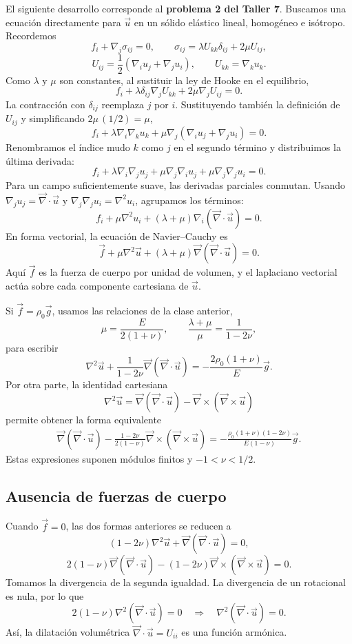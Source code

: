El siguiente desarrollo corresponde al \textbf{problema 2 del Taller 7}. Buscamos una ecuación directamente para $\vec u$ en un sólido elástico lineal, homogéneo e isótropo. Recordemos
\[
f_i+\nabla_j\sigma_{ij}=0,
\qquad
\sigma_{ij}=\lambda U_{kk}\delta_{ij}+2\mu U_{ij},
\]
\[
U_{ij}=\frac{1}{2}(\nabla_i u_j+\nabla_j u_i),
\qquad U_{kk}=\nabla_k u_k.
\]
Como $\lambda$ y $\mu$ son constantes, al sustituir la ley de Hooke en el equilibrio,
\[
f_i+\lambda\delta_{ij}\nabla_j U_{kk}
+2\mu\nabla_j U_{ij}=0.
\]
La contracción con $\delta_{ij}$ reemplaza $j$ por $i$. Sustituyendo también la definición de $U_{ij}$ y simplificando $2\mu\,(1/2)=\mu$,
\[
f_i+\lambda\nabla_i\nabla_k u_k
+\mu\nabla_j(\nabla_i u_j+\nabla_j u_i)=0.
\]
Renombramos el índice mudo $k$ como $j$ en el segundo término y distribuimos la última derivada:
\[
f_i+\lambda\nabla_i\nabla_j u_j
+\mu\nabla_j\nabla_i u_j
+\mu\nabla_j\nabla_j u_i=0.
\]
Para un campo suficientemente suave, las derivadas parciales conmutan. Usando $\nabla_j u_j=\vec\nabla\cdot\vec u$ y $\nabla_j\nabla_j u_i=\nabla^2u_i$, agrupamos los términos:
\[
\boxed{f_i+\mu\nabla^2u_i
+(\lambda+\mu)\nabla_i(\vec\nabla\cdot\vec u)=0}.
\]
En forma vectorial, la ecuación de Navier--Cauchy es
\[
\boxed{\vec f+\mu\nabla^2\vec u
+(\lambda+\mu)\vec\nabla(\vec\nabla\cdot\vec u)=0}.
\]
Aquí $\vec f$ es la fuerza de cuerpo por unidad de volumen, y el laplaciano vectorial actúa sobre cada componente cartesiana de $\vec u$.

Si $\vec f=\rho_0\vec g$, usamos las relaciones de la clase anterior,
\[
\mu=\frac{E}{2(1+\nu)},
\qquad
\frac{\lambda+\mu}{\mu}=\frac{1}{1-2\nu},
\]
para escribir
\[
\nabla^2\vec u+\frac{1}{1-2\nu}
\vec\nabla(\vec\nabla\cdot\vec u)
=-\frac{2\rho_0(1+\nu)}{E}\vec g.
\]
Por otra parte, la identidad cartesiana
\[
\nabla^2\vec u
=\vec\nabla(\vec\nabla\cdot\vec u)
-\vec\nabla\times(\vec\nabla\times\vec u)
\]
permite obtener la forma equivalente
\[
\begin{aligned}
\vec\nabla(\vec\nabla\cdot\vec u)
-\frac{1-2\nu}{2(1-\nu)}
\vec\nabla\times(\vec\nabla\times\vec u)
=-\frac{\rho_0(1+\nu)(1-2\nu)}{E(1-\nu)}\vec g.
\end{aligned}
\]
Estas expresiones suponen módulos finitos y $-1<\nu<1/2$.

\subsection{Ausencia de fuerzas de cuerpo}

Cuando $\vec f=0$, las dos formas anteriores se reducen a
\[
(1-2\nu)\nabla^2\vec u
+\vec\nabla(\vec\nabla\cdot\vec u)=0,
\]
\[
2(1-\nu)\vec\nabla(\vec\nabla\cdot\vec u)
-(1-2\nu)\vec\nabla\times(\vec\nabla\times\vec u)=0.
\]
Tomamos la divergencia de la segunda igualdad. La divergencia de un rotacional es nula, por lo que
\[
2(1-\nu)\nabla^2(\vec\nabla\cdot\vec u)=0
\quad\Longrightarrow\quad
\boxed{\nabla^2(\vec\nabla\cdot\vec u)=0}.
\]
Así, la dilatación volumétrica $\vec\nabla\cdot\vec u=U_{ii}$ es una función armónica.

